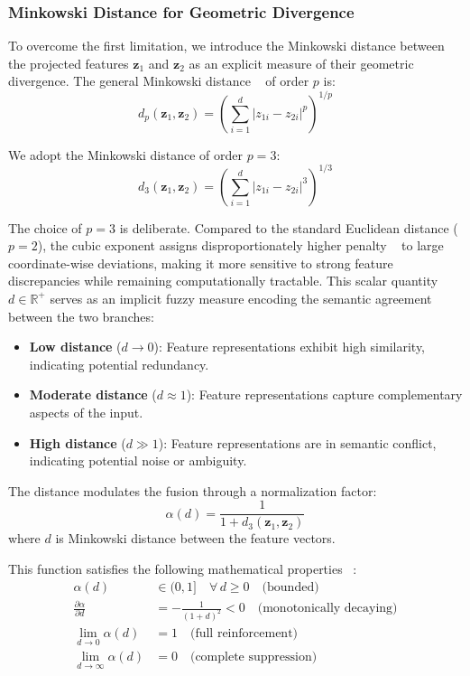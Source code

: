\documentclass[preprint,12pt]{elsarticle}
\begin{document}
\subsubsection{Minkowski Distance for Geometric Divergence}

To overcome the first limitation, we introduce the Minkowski distance between the projected features $\mathbf{z}_1$ and $\mathbf{z}_2$ as an explicit measure of their geometric divergence. The general Minkowski distance ~\cite{b9} of order $p$ is:
\begin{equation*}
    d_p(\mathbf{z}_1, \mathbf{z}_2) = \left( \sum_{i=1}^{d} |z_{1i} - z_{2i}|^p \right)^{1/p}
\end{equation*}

We adopt the Minkowski distance of order $p = 3$:
\begin{equation*}
    d_3(\mathbf{z}_1, \mathbf{z}_2) = \left( \sum_{i=1}^{d} |z_{1i} - z_{2i}|^3 \right)^{1/3}
\end{equation*}

The choice of $p=3$ is deliberate. Compared to the standard Euclidean distance ($p=2$), the cubic exponent assigns disproportionately higher penalty ~\cite{b10} to large coordinate-wise deviations, making it more sensitive to strong feature discrepancies while remaining computationally tractable. This scalar quantity $d \in \mathbb{R}^+$ serves as an implicit fuzzy measure encoding the semantic agreement between the two branches:

\begin{itemize}
    \item \textbf{Low distance} ($d \rightarrow 0$): Feature representations exhibit high similarity, indicating potential redundancy.
    \item \textbf{Moderate distance} ($d \approx 1$): Feature representations capture complementary aspects of the input.
    \item \textbf{High distance} ($d \gg 1$): Feature representations are in semantic conflict, indicating potential noise or ambiguity.
\end{itemize}

The distance modulates the fusion through a normalization factor:
\begin{equation*}
    \alpha(d) = \frac{1}{1 + d_3(\mathbf{z}_1, \mathbf{z}_2)}
\end{equation*}
where $d$ is Minkowski distance between the feature vectors.

This function satisfies the following mathematical properties ~\cite{b32}: 
\begin{align*}
    \alpha(d) &\in (0, 1] \quad \forall \, d \geq 0 \quad \text{(bounded)} \\
    \frac{\partial \alpha}{\partial d} &= -\frac{1}{(1+d)^2} < 0 \quad \text{(monotonically decaying)} \\
    \lim_{d \to 0} \alpha(d) &= 1 \quad \text{(full reinforcement)} \\
    \lim_{d \to \infty} \alpha(d) &= 0 \quad \text{(complete suppression)}
\end{align*}
\end{document}

